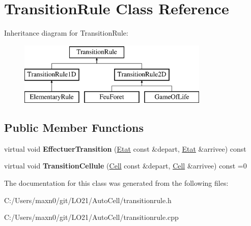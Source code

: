 \hypertarget{class_transition_rule}{}\section{Transition\+Rule Class Reference}
\label{class_transition_rule}
Inheritance diagram for Transition\+Rule\+:\begin{figure}[H]
\begin{center}
\leavevmode
\includegraphics[height=3.000000cm]{class_transition_rule}
\end{center}
\end{figure}
\subsection*{Public Member Functions}
\begin{DoxyCompactItemize}
\item 
\mbox{\label{class_transition_rule_a8570188a32e648ce3c08e76065f88fb7}} 
virtual void {\bfseries Effectuer\+Transition} (\mbox{\hyperlink{class_etat}{Etat}} const \&depart, \mbox{\hyperlink{class_etat}{Etat}} \&arrivee) const
\item 
\mbox{\label{class_transition_rule_a2b82a75ef494adc91b28755d55666e7a}} 
virtual void {\bfseries Transition\+Cellule} (\mbox{\hyperlink{class_cell}{Cell}} const \&depart, \mbox{\hyperlink{class_cell}{Cell}} \&arrivee) const =0
\end{DoxyCompactItemize}


The documentation for this class was generated from the following files\+:\begin{DoxyCompactItemize}
\item 
C\+:/\+Users/maxn0/git/\+L\+O21/\+Auto\+Cell/transitionrule.\+h\item 
C\+:/\+Users/maxn0/git/\+L\+O21/\+Auto\+Cell/transitionrule.\+cpp\end{DoxyCompactItemize}
